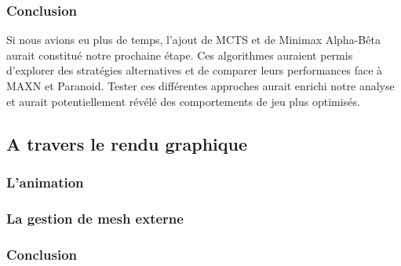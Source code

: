 \subsubsection{Conclusion}
Si nous avions eu plus de temps, l’ajout de MCTS et de Minimax Alpha-Bêta aurait constitué notre prochaine étape. Ces algorithmes auraient permis d’explorer des stratégies alternatives et de comparer leurs performances face à MAXN et Paranoid. Tester ces différentes approches aurait enrichi notre analyse et aurait potentiellement révélé des comportements de jeu plus optimisés.

\subsection{A travers le rendu graphique}
\subsubsection{L'animation}
\subsubsection{La gestion de mesh externe}
\subsubsection{Conclusion}